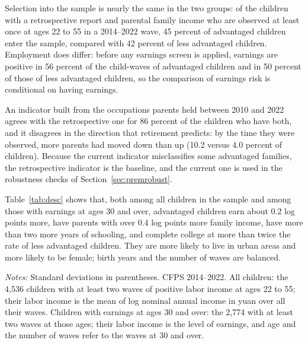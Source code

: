 \documentclass[11pt]{article}
\begin{document}
Selection into the sample is nearly the same in the two groups: of the children with a retrospective report and parental family income who are observed at least once at ages 22 to 55 in a 2014--2022 wave, 45 percent of advantaged children enter the sample, compared with 42 percent of less advantaged children. Employment does differ: before any earnings screen is applied, earnings are positive in 56 percent of the child-waves of advantaged children and in 50 percent of those of less advantaged children, so the comparison of earnings risk is conditional on having earnings.

An indicator built from the occupations parents held between 2010 and 2022 agrees with the retrospective one for 86 percent of the children who have both, and it disagrees in the direction that retirement predicts: by the time they were observed, more parents had moved down than up (10.2 versus 4.0 percent of children). Because the current indicator misclassifies some advantaged families, the retrospective indicator is the baseline, and the current one is used in the robustness checks of Section~\ref{sec:premrobust}.

Table~\ref{tab:desc} shows that, both among all children in the sample and among those with earnings at ages 30 and over, advantaged children earn about 0.2 log points more, have parents with over 0.4 log points more family income, have more than two more years of schooling, and complete college at more than twice the rate of less advantaged children. They are more likely to live in urban areas and more likely to be female; birth years and the number of waves are balanced.


\begin{table}[t]
\centering
\small
\caption{Sample means by family background.}
\label{tab:desc}

\par\smallskip
\begin{minipage}{0.92\textwidth}
\footnotesize\emph{Notes:} Standard deviations in parentheses. CFPS
2014--2022. All children: the 4,536 children with at least two waves of
positive labor income at ages 22 to 55; their labor income is the mean
of log nominal annual income in yuan over all their waves. Children with earnings at ages 30 and over: the 2,774 with at least two waves at those ages; their labor income is the level of earnings, and age and the number of waves refer to the waves
at 30 and over.
\end{minipage}
\end{table}
\end{document}
